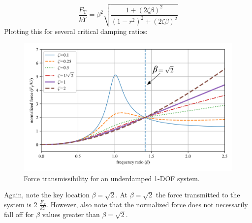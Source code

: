 \documentclass[12pt,letter]{article}
\numberwithin{ex}{section} %
\numberwithin{re}{section} %
\begin{document}
				\begin{equation}
					\frac{F_\text{T}}{kY} = \beta^2 \sqrt{\frac{1+(2 \zeta \beta)^2}{(1-r^2)^2 + (2 \zeta \beta )^2}} 
				\end{equation}
				Plotting this for several critical damping ratios:
				\begin{figure}[H]
					\centering
					\includegraphics[]{../Figures/base_excitation_force_transmissibility.png}
					\caption{Force transmissibility for an underdamped 1-DOF system.}
				\end{figure}
				Again, note the key location $\beta=\sqrt{2}$. At $\beta=\sqrt{2}$ the force transmitted to the system is 2 $\frac{F_\text{T}}{kY}$. However, also note that the normalized force does not necessarily fall off for $\beta$ values greater than $\beta=\sqrt{2}$.  
	
\end{document}
